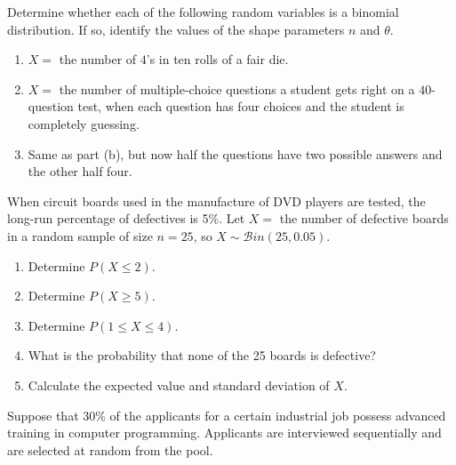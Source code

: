 \documentclass[12pt,reqno]{amsart}
\begin{document}
\bigskip

\prob Determine whether each of the following random variables is a binomial distribution. If so, identify the values of the shape parameters $n$ and $\theta$.

\medskip
\begin{enumerate}
\item $X=$ the number of $4$'s in ten rolls of a fair die.\vfill
\item $X=$ the number of multiple-choice questions a student gets right on a $40$-question test, when each question has four choices and the student is completely guessing.\vfill
\item Same as part (b), but now half the questions have two possible answers and the other half four.\vfill
\end{enumerate}











\bigskip
\prob When circuit boards used in the manufacture of DVD players are tested, the long-run percentage of defectives is 5\%. Let $X =$ the number of defective boards in a random sample of size $n = 25$, so $X \sim \mathcal{B}in(25, 0.05)$.

\medskip
\begin{enumerate}
\item Determine $P(X\leq 2)$.\vfill
\item Determine $P(X\geq 5)$.\vfill
\item Determine $P(1\leq X \leq 4)$.\vfill
\item What is the probability that none of the 25 boards is defective?\vfill
\item Calculate the expected value and standard deviation of $X$.\vfill
\end{enumerate}












\newpage
\prob Suppose that 30\% of the applicants for a certain industrial job possess advanced training in computer programming. Applicants are interviewed sequentially and are selected at random from the pool.
\end{document}
